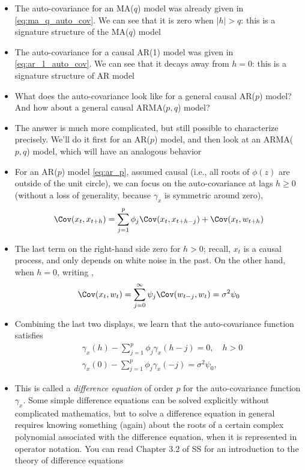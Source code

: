 \documentclass{article}
\begin{document}
\begin{itemize}
\item The auto-covariance for an MA($q$) model was already given in
  \eqref{eq:ma_q_auto_cov}. We can see that it is zero when $|h| > q$: this is a
  signature structure of the MA($q$) model 

\item The auto-covariance for a causal AR(1) model was given in
  \eqref{eq:ar_1_auto_cov}. We can see that it decays away from $h=0$: this is 
  a signature structure of AR model

\item What does the auto-covariance look like for a general causal AR($p$)
  model? And how about a general causal ARMA($p,q$) model?    

\item The answer is much more complicated, but still possible to characterize
  precisely. We'll do it first for an AR($p$) model, and then look at an
  ARMA($p,q$) model, which will have an analogous behavior 

\item For an AR($p$) model \eqref{eq:ar_p}, assumed causal (i.e., all roots of
  $\phi(z)$ are outside of the unit circle), we can focus on the auto-covariance  
  at lags $ h \geq 0$ (without a loss of generality, because $\gamma_x$ is
  symmetric around zero), 
  \[
  \Cov(x_t, x_{t+h}) = \sum_{j=1}^p \phi_j \Cov(x_t, x_{t+h-j}) + \Cov(x_t,
  w_{t+h})  
  \]

\item The last term on the right-hand side zero for $h>0$; recall, $x_t$ is a  
  causal process, and only depends on white noise in the past. On the other
  hand, when $h=0$, writing , 
  \[
  \Cov(x_t, w_t) = \sum_{j=0}^\infty \psi_j \Cov(w_{t-j}, w_t) =  \sigma^2
  \psi_0   
  \]

\item Combining the last two displays, we learn that the auto-covariance
  function satisfies 
  \begin{align*}
  &\gamma_x(h) - \sum_{j=1}^p \phi_j \gamma_x(h-j) = 0, \quad h > 0 \\ 
  &\gamma_x(0) - \sum_{j=1}^p \phi_j \gamma_x(-j) = \sigma^2 \psi_0, 
  \end{align*}

\item This is called a \emph{difference equation} of order $p$ for the
  auto-covariance function $\gamma_x$. Some simple difference equations can be
  solved explicitly without complicated mathematics, but to solve a difference  
  equation in general requires knowing something (again) about the roots of a
  certain complex polynomial associated with the difference equation, when it is
  represented in operator notation. You can read Chapter 3.2 of SS for an
  introduction to the theory of difference equations


\end{itemize}
\end{document}
